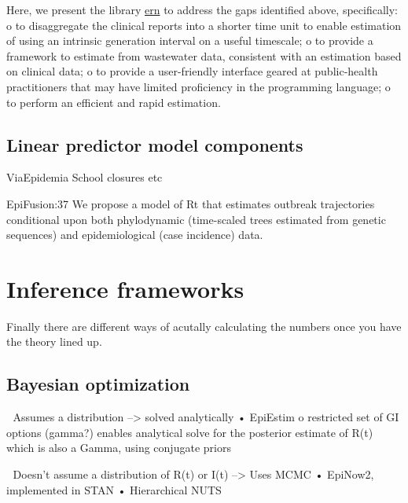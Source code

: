 \documentclass[
  letterpaper,
  DIV=11,
  numbers=noendperiod]{scrreprt}
\begin{document}
Here, we present the library \href{package_ern.qmd}{ern} to address the
gaps identified above, specifically: o to disaggregate the clinical
reports into a shorter time unit to enable estimation of using an
intrinsic generation interval on a useful timescale; o to provide a
framework to estimate from wastewater data, consistent with an
estimation based on clinical data; o to provide a user-friendly
interface geared at public-health practitioners that may have limited
proficiency in the programming language; o to perform an efficient and
rapid estimation.

\section*{Linear predictor model
components}\label{linear-predictor-model-components}


ViaEpidemia School closures etc

EpiFusion:37 We propose a model of Rt that estimates outbreak
trajectories conditional upon both phylodynamic (time-scaled trees
estimated from genetic sequences) and epidemiological (case incidence)
data.

\chapter*{Inference frameworks}\label{inference-frameworks}


Finally there are different ways of acutally calculating the numbers
once you have the theory lined up.

\section*{Bayesian optimization}\label{bayesian-optimization}


 Assumes a distribution --\textgreater{} solved analytically • EpiEstim
o restricted set of GI options (gamma?) enables analytical solve for the
posterior estimate of R(t) which is also a Gamma, using conjugate priors

 Doesn't assume a distribution of R(t) or I(t) --\textgreater{} Uses
MCMC • EpiNow2, implemented in STAN • Hierarchical NUTS
\end{document}
